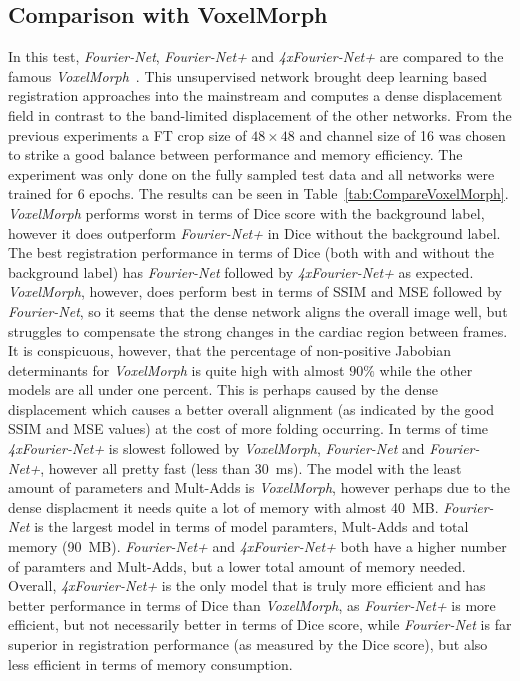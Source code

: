 \documentclass[english,version-2022-01]{uzl-thesis} %
\begin{document}
\subsection{Comparison with VoxelMorph} \label{SubSec:ResultsComparisonVoxelMorph}
In this test, \emph{Fourier-Net}, \emph{Fourier-Net+} and \emph{4xFourier-Net+} are compared to the famous \emph{VoxelMorph}~\cite{Voxelmorph}. This unsupervised network brought deep learning based registration approaches into the mainstream and computes a dense displacement field in contrast to the band-limited displacement of the other networks. From the previous experiments a FT crop size of $48 \times 48$ and channel size of 16 was chosen to strike a good balance between performance and memory efficiency. The experiment was only done on the fully sampled test data and all networks were trained for 6 epochs. The results can be seen in Table~\ref{tab:CompareVoxelMorph}.\\
\emph{VoxelMorph} performs worst in terms of Dice score with the background label, however it does outperform \emph{Fourier-Net+} in Dice without the background label. The best registration performance in terms of Dice (both with and without the background label) has \emph{Fourier-Net} followed by \emph{4xFourier-Net+} as expected. \emph{VoxelMorph}, however, does perform best in terms of SSIM and MSE followed by \emph{Fourier-Net}, so it seems that the dense network aligns the overall image well, but struggles to compensate the strong changes in the cardiac region between frames. It is conspicuous, however, that the percentage of non-positive Jabobian determinants for \emph{VoxelMorph} is quite high with almost $90\%$ while the other models are all under one percent. This is perhaps caused by the dense displacement which causes a better overall alignment (as indicated by the good SSIM and MSE values) at the cost of more folding occurring. In terms of time \emph{4xFourier-Net+} is slowest followed by  \emph{VoxelMorph}, \emph{Fourier-Net} and \emph{Fourier-Net+}, however all pretty fast (less than 30~ms). The model with the least amount of parameters and Mult-Adds is \emph{VoxelMorph}, however perhaps due to the dense displacment it needs quite a lot of memory with almost 40~MB. \emph{Fourier-Net} is the largest model in terms of model paramters, Mult-Adds and total memory (90~MB). \emph{Fourier-Net+} and \emph{4xFourier-Net+} both have a higher number of paramters and Mult-Adds, but a lower total amount of memory needed. Overall, \emph{4xFourier-Net+} is the only model that is truly more efficient and has better performance in terms of Dice than \emph{VoxelMorph}, as \emph{Fourier-Net+} is more efficient, but not necessarily better in terms of Dice score, while \emph{Fourier-Net} is far superior in registration performance (as measured by the Dice score), but also less efficient in terms of memory consumption.
\end{document}
